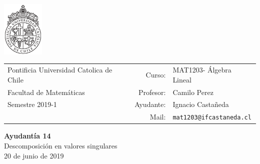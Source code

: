 \documentclass[12pt]{article}
\makeatletter
\newcommand{\ayudantia}{{\sc Ayudantía 14}}
\newcommand{\tituloayu}{Descomposición en valores singulares}
\newcommand{\fecha}{20 de junio de 2019}
\newcommand{\sigla}{MAT1203}
\newcommand{\nombre}{Álgebra Lineal}
\newcommand{\profesor}{Camilo Perez}
\newcommand{\ano}{2019}
\newcommand{\semestre}{1}
\newcommand{\mail}{mat1203@ifcastaneda.cl}
\makeatother
\begin{document}
\thispagestyle{empty}

\begin{minipage}{2cm}
	\includegraphics[width=2cm]{../../../../img/logo.pdf}
	\vspace{0.5cm}
\end{minipage}
\begin{minipage}{\linewidth}
	\begin{tabular}{lrl}
		{\scriptsize\sc Pontificia Universidad Catolica de Chile} & \hspace*{0.7in}Curso: &
		\sigla  - \nombre\\
		{\sc Facultad de Matemáticas}&
		Profesor: & \profesor \\
		{\sc Semestre \ano-\semestre} & Ayudante: & {Ignacio Castañeda}\\
		& {Mail:} & \texttt{\mail}
	\end{tabular}
\end{minipage}

\vspace{-10mm}
\begin{center}
	{\LARGE\bf \ayudantia}\\
	\vspace{0.1cm}
	{\tituloayu}\\
	\vspace{0.1cm}
	\fecha\\
	\vspace{0.4cm}
\end{center}
\end{document}
